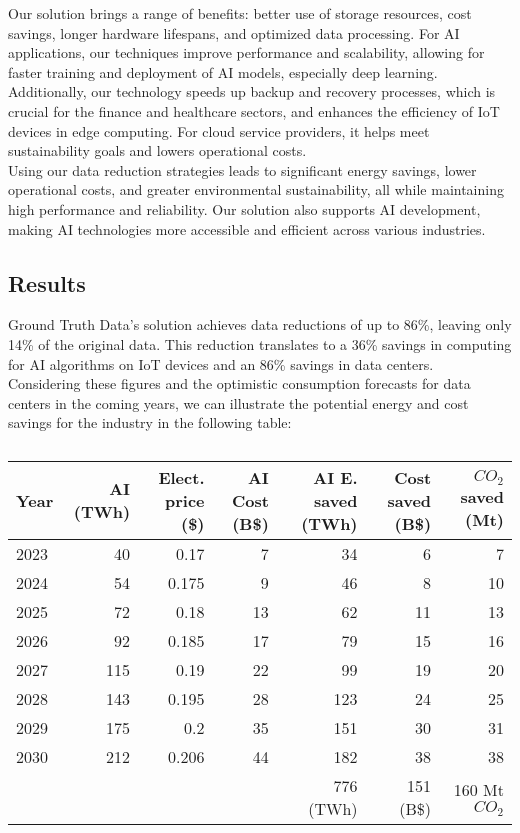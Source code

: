 Our solution brings a range of benefits: better use of storage resources, cost savings, longer hardware lifespans, and optimized data processing. For AI applications, our techniques improve performance and scalability, allowing for faster training and deployment of AI models, especially deep learning.\\

Additionally, our technology speeds up backup and recovery processes, which is crucial for the finance and healthcare sectors, and enhances the efficiency of IoT devices in edge computing. For cloud service providers, it helps meet sustainability goals and lowers operational costs.\\

Using our data reduction strategies leads to significant energy savings, lower operational costs, and greater environmental sustainability, all while maintaining high performance and reliability. Our solution also supports AI development, making AI technologies more accessible and efficient across various industries.

\subsection{Results}

Ground Truth Data's solution achieves data reductions of up to 86\%, leaving only 14\% of the original data. This reduction translates to a 36\% savings in computing for AI algorithms on IoT devices and an 86\% savings in data centers.\\


Considering these figures and the optimistic consumption forecasts for data centers in the coming years, we can illustrate the potential energy and cost savings for the industry in the following table:

\begin{table}[H]
    \centering
    \footnotesize
    \begin{tabular}{|lrrrrrr}
        \toprule
        Year & AI (TWh) & Elect. price (\$) & AI Cost (B\$) & AI E. saved (TWh) & Cost saved (B\$)  & $CO_2$ saved (Mt)  \\
        \midrule
        2023 & 40  & 0.17  & 7  & 34  & 6  & 7  \\
        2024 & 54  & 0.175 & 9  & 46  & 8  & 10 \\
        2025 & 72  & 0.18  & 13 & 62  & 11 & 13 \\
        2026 & 92  & 0.185 & 17 & 79  & 15 & 16 \\
        2027 & 115 & 0.19  & 22 & 99  & 19 & 20 \\
        2028 & 143 & 0.195 & 28 & 123 & 24 & 25 \\
        2029 & 175 & 0.2   & 35 & 151 & 30 & 31 \\
        2030 & 212 & 0.206 & 44 & 182 & 38 & 38 \\
        \midrule
        & & & & 776 (TWh) & 151 (B\$) & 160 Mt $CO_2$ \\
        \bottomrule
    \end{tabular}
    \caption{}
    \label{tab:ai_summary}
\end{table}


